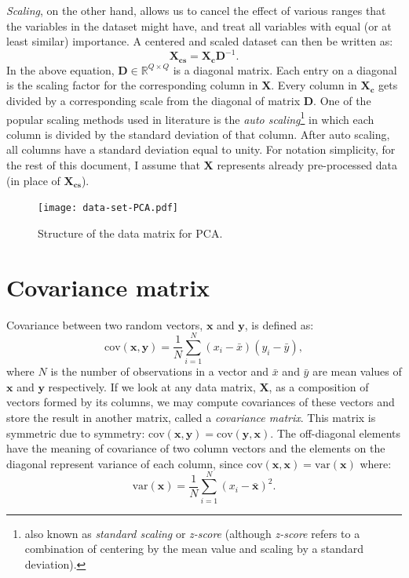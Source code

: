 \documentclass[10pt,twocolumn]{article}
\begin{document}
\textit{Scaling}, on the other hand, allows us to cancel the effect of various ranges that the variables in the dataset might have, and treat all variables with equal (or at least similar) importance. A centered and scaled dataset can then be written as:
\begin{equation}
\mathbf{X_{cs}} = \mathbf{X_c}\mathbf{D}^{-1}.
\end{equation}
In the above equation, $\mathbf{D} \in \mathbb{R}^{Q \times Q}$ is a diagonal matrix. Each entry on a diagonal is the scaling factor for the corresponding column in $\mathbf{X}$. Every column in $\mathbf{X_c}$ gets divided by a corresponding scale from the diagonal of matrix $\mathbf{D}$. One of the popular scaling methods used in literature is the \textit{auto scaling}\footnote{also known as \textit{standard scaling} or \textit{z-score} (although \textit{z-score} refers to a combination of centering by the mean value and scaling by a standard deviation).} in which each column is divided by the standard deviation of that column. After auto scaling, all columns have a standard deviation equal to unity. For notation simplicity, for the rest of this document, I assume that $\mathbf{X}$ represents already pre-processed data (in place of $\mathbf{X_{cs}}$).

\begin{figure}[t]
\centering\texttt{[image: data-set-PCA.pdf]}
\caption{Structure of the data matrix for PCA.}
\label{fig:data-matrix}
\end{figure}

\section{Covariance matrix}

Covariance between two random vectors, $\mathbf{x}$ and $\mathbf{y}$, is defined as:
\begin{equation}\label{eq:covariance-definition}
\text{cov}(\mathbf{x},\mathbf{y}) = \frac{1}{N} \sum_{i=1}^{N} (x_i - \bar{x}) (y_i - \bar{y}),
\end{equation}
where $N$ is the number of observations in a vector and $\bar{x}$ and $\bar{y}$ are mean values of $\mathbf{x}$ and $\mathbf{y}$ respectively. If we look at any data matrix, $\mathbf{X}$, as a composition of vectors formed by its columns, we may compute covariances of these vectors and store the result in another matrix, called a \textit{covariance matrix}. This matrix is symmetric due to symmetry: $\text{cov}(\mathbf{x},\mathbf{y}) = \text{cov}(\mathbf{y},\mathbf{x})$. The off-diagonal elements have the meaning of covariance of two column vectors and the elements on the diagonal represent variance of each column, since $\text{cov}(\mathbf{x},\mathbf{x}) = \text{var}(\mathbf{x})$ where:
\begin{equation}\label{eq:variance-definition}
\text{var}(\mathbf{x}) = \frac{1}{N} \sum_{i=1}^{N} (x_i - \bar{\mathbf{x}})^2.
\end{equation}
\end{document}

